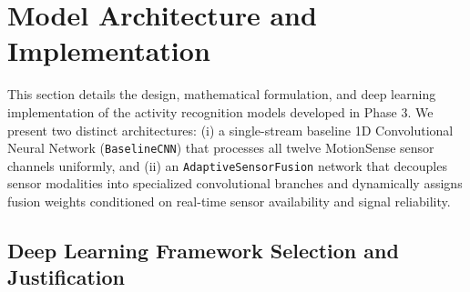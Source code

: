 
\section{Model Architecture and Implementation}
\label{sec:model_architecture}

This section details the design, mathematical formulation, and deep learning implementation of the activity recognition models developed in Phase 3. We present two distinct architectures: (i) a single-stream baseline 1D Convolutional Neural Network (\texttt{BaselineCNN}) that processes all twelve MotionSense sensor channels uniformly, and (ii) an \texttt{AdaptiveSensorFusion} network that decouples sensor modalities into specialized convolutional branches and dynamically assigns fusion weights conditioned on real-time sensor availability and signal reliability.

\subsection{Deep Learning Framework Selection and Justification}
\label{subsec:framework_selection}

